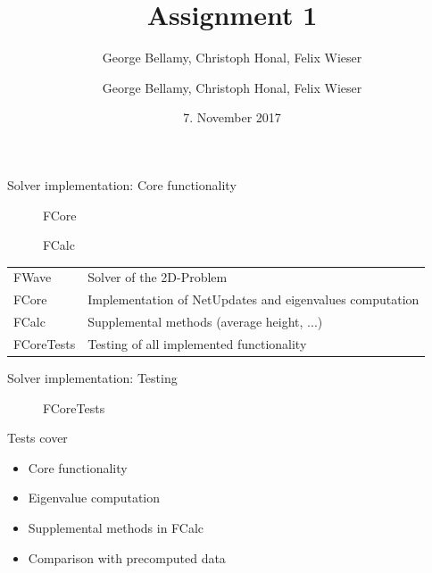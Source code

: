 \documentclass[shortpres]{beamer}
\title[{Tsunami simulation}]{Assignment 1}
\author[Bellamy Honal, Wieser]{George Bellamy, Christoph Honal, Felix Wieser\newline\vspace{10pt}{\small Bachelorpraktikum}}
\author[Bellamy Honal, Wieser]{George Bellamy, Christoph Honal, Felix Wieser\\\vspace{10pt}{\small Bachelorpraktikum}}
\institute[TU M\"unchen]{Techncal University of Munich}
\date{7. November 2017}
\begin{document}
\maketitle

\begin{frame}{Solver implementation: Core functionality}
	\begin{multicols}{2}
		\begin{figure}[t]
			\caption*{FCore}			
		\end{figure}

		\columnbreak
		
		\begin{figure}[t]
%			
			\caption*{FCalc}
		\end{figure}

	\end{multicols}
	\begin{tabular}{ll}
		FWave & Solver of the 2D-Problem\\
		FCore & Implementation of NetUpdates and eigenvalues computation\\
		FCalc & Supplemental methods (average height, ...)\\
		FCoreTests & Testing of all implemented functionality
	\end{tabular}
\end{frame}

\begin{frame}{Solver implementation: Testing}
	\begin{multicols}{2}
		
		\begin{figure}
%			
			\caption*{FCoreTests}
		\end{figure}
		
		\columnbreak
		
		Tests cover
		\begin{itemize}
			\item Core functionality
			\item Eigenvalue computation
			\item Supplemental methods in FCalc
			\item Comparison with precomputed data
		\end{itemize}
	\end{multicols}
\end{frame}
\end{document}
